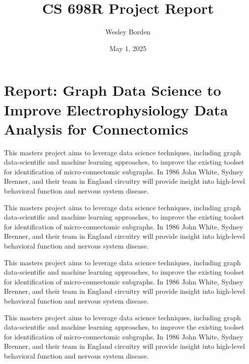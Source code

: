 \documentclass[11pt]{article}
\title{CS 698R Project Report}
\author{Wesley Borden}
\date{May 1, 2025}
\newcommand{\sectionwithindent}[1]{
    \section*{#1}
    \hspace{\parindent} %
}
\begin{document}
\sectionwithindent{Report: Graph Data Science to Improve Electrophysiology Data\\Analysis for Connectomics}
This masters project aims to leverage data science techniques, including graph data-scientific and machine learning approaches, to improve the existing toolset for identification of micro-connectomic subgraphs. In 1986 John White, Sydney Brenner, and their team in England circuitry will provide insight into high-level behavioral function and nervous system disease.

This masters project aims to leverage data science techniques, including graph data-scientific and machine learning approaches, to improve the existing toolset for identification of micro-connectomic subgraphs. In 1986 John White, Sydney Brenner, and their team in England circuitry will provide insight into high-level behavioral function and nervous system disease.

This masters project aims to leverage data science techniques, including graph data-scientific and machine learning approaches, to improve the existing toolset for identification of micro-connectomic subgraphs. In 1986 John White, Sydney Brenner, and their team in England circuitry will provide insight into high-level behavioral function and nervous system disease.

This masters project aims to leverage data science techniques, including graph data-scientific and machine learning approaches, to improve the existing toolset for identification of micro-connectomic subgraphs. In 1986 John White, Sydney Brenner, and their team in England circuitry will provide insight into high-level behavioral function and nervous system disease.
\end{document}
